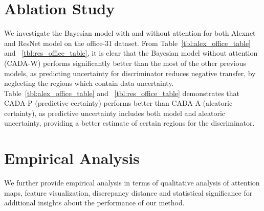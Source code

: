 \documentclass[10pt,twocolumn,letterpaper]{article}
\begin{document}
\section{ Ablation Study }
\vspace{-0.1cm}
We investigate the Bayesian model with and without attention for both Alexnet and ResNet model on the office-31 dataset. From Table~\ref{tbl:alex_office_table} and ~\ref{tbl:res_office_table}, it is clear that the Bayesian model without attention (CADA-W) performs significantly better than the most of the other previous models, as predicting uncertainty for discriminator reduces negative transfer, by neglecting the regions which contain data uncertainty. Table~\ref{tbl:alex_office_table} and ~\ref{tbl:res_office_table} demonstrates that CADA-P (predictive certainty) performs better than CADA-A (aleatoric certainty), as predictive uncertainty includes both model and aleatoric uncertainty, providing a better estimate of certain regions for the discriminator.

\vspace{-0.2cm}
\section{Empirical Analysis}
\vspace{-0.1cm}
We further provide empirical analysis in terms of qualitative analysis of attention maps, feature visualization, discrepancy distance and statistical significance for additional insights about the performance of our method.
\end{document}
